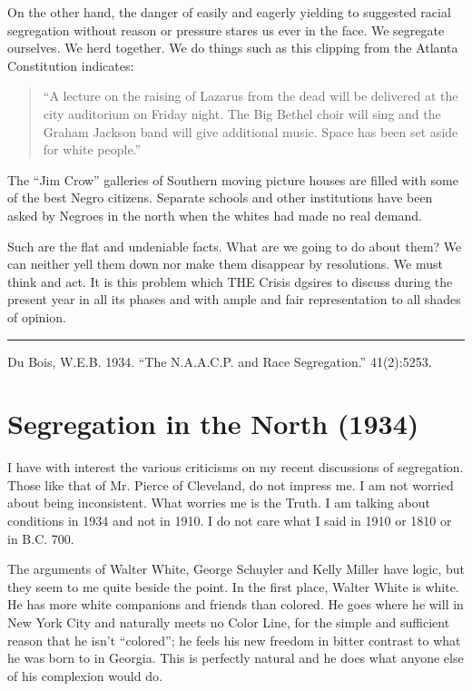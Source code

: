 \documentclass[letterpaper,10pt,english]{jupyterBook}
\begin{document}
\sphinxAtStartPar
On the other hand, the danger of easily and eagerly yielding to suggested racial segregation without reason or pressure stares us ever in the face. We segregate ourselves. We herd together. We do things such as this clipping from the Atlanta Constitution indicates:
\begin{quote}

\sphinxAtStartPar
“A lecture on the raising of Lazarus from the dead will be delivered at the city auditorium on Friday night. The Big Bethel choir will sing and the Graham Jackson band will give additional music. Space has been set aside for white people.”
\end{quote}

\sphinxAtStartPar
The “Jim Crow” galleries of Southern moving picture houses are filled with some of the best Negro citizens. Separate schools and other institutions have been asked by Negroes in the north when the whites had made no real demand.

\sphinxAtStartPar
Such are the flat and undeniable facts. What are we going to do about them? We can neither yell them down nor make them disappear by resolutions. We must think and act. It is this problem which THE Crisis dgsires to discuss during the present year in all its phases and with ample and fair representation to all shades of opinion.


\bigskip\hrule\bigskip


\sphinxAtStartPar
{} Du Bois, W.E.B. 1934. “The N.A.A.C.P. and Race Segregation.” 41(2):52\sphinxhyphen{}53.


\section{Segregation in the North (1934)}
\label{\detokenize{Volumes/41/04/segregation_in_the_north:segregation-in-the-north-1934}}\label{\detokenize{Volumes/41/04/segregation_in_the_north::doc}}
\sphinxAtStartPar
I have with interest the various criticisms on my recent discussions of segregation. Those like that of Mr. Pierce of Cleveland, do not impress me. I am not worried about being inconsistent. What worries me is the Truth. I am talking about conditions in 1934 and not in 1910. I do not care what I said in 1910 or 1810 or in B.C. 700.

\sphinxAtStartPar
The arguments of Walter White, George Schuyler and Kelly Miller have logic, but they seem to me quite beside the point. In the first place, Walter White is white. He has more white companions and friends than colored. He goes where he will in New York City and naturally meets no Color Line, for the simple and sufficient reason that he isn’t “colored”; he feels his new freedom in bitter contrast to what he was born to in Georgia. This is perfectly natural and he does what anyone else of his complexion would do.
\end{document}
